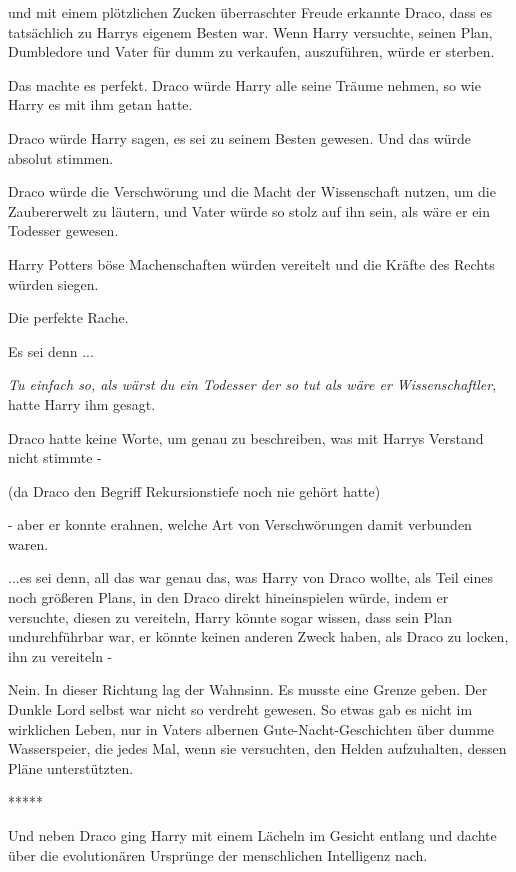 und mit einem plötzlichen Zucken überraschter Freude erkannte Draco, dass es
tatsächlich zu Harrys eigenem Besten war. Wenn Harry versuchte, seinen Plan,
Dumbledore und Vater für dumm zu verkaufen, auszuführen, würde er sterben.

Das machte es perfekt. Draco würde Harry alle seine Träume nehmen, so wie Harry
es mit ihm getan hatte.

Draco würde Harry sagen, es sei zu seinem Besten gewesen. Und das würde absolut
stimmen.

Draco würde die Verschwörung und die Macht der Wissenschaft nutzen, um die
Zaubererwelt zu läutern, und Vater würde so stolz auf ihn sein, als wäre er ein
Todesser gewesen.

Harry Potters böse Machenschaften würden vereitelt und die Kräfte des Rechts
würden siegen.

Die perfekte Rache.

Es sei denn ...

\emph{Tu einfach so, als wärst du ein Todesser der so tut als wäre er
Wissenschaftler}, hatte Harry ihm gesagt.

Draco hatte keine Worte, um genau zu beschreiben, was mit Harrys Verstand nicht
stimmte -

(da Draco den Begriff \glqq{}Rekursionstiefe\grqq{} noch nie gehört hatte)

- aber er konnte erahnen, welche Art von Verschwörungen damit verbunden waren.

...es sei denn, all das war genau das, was Harry von Draco wollte, als Teil
eines noch größeren Plans, in den Draco direkt hineinspielen würde, indem er
versuchte, diesen zu vereiteln, Harry könnte sogar wissen, dass sein Plan
undurchführbar war, er könnte keinen anderen Zweck haben, als Draco zu locken,
ihn zu vereiteln -

Nein. In dieser Richtung lag der Wahnsinn. Es musste eine Grenze geben. Der
Dunkle Lord selbst war nicht so verdreht gewesen. So etwas gab es nicht im
wirklichen Leben, nur in Vaters albernen Gute-Nacht-Geschichten über dumme
Wasserspeier, die jedes Mal, wenn sie versuchten, den Helden aufzuhalten, dessen
Pläne unterstützten.

\begin{center}*****\end{center}

Und neben Draco ging Harry mit einem Lächeln im Gesicht entlang und dachte über
die evolutionären Ursprünge der menschlichen Intelligenz nach.


